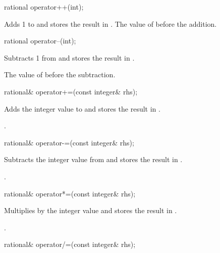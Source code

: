\begin{itemdecl}
rational operator++(int);
\end{itemdecl}

\begin{itemdescr}
\effects Adds 1 to  and stores the result in .
\returns The value of  before the addition.
\end{itemdescr}

\begin{itemdecl}
rational operator--(int);
\end{itemdecl}

\begin{itemdescr}
\effects Subtracts 1 from  and stores the result in .

\returns The value of  before the subtraction.
\end{itemdescr}

\begin{itemdecl}
rational& operator+=(const integer& rhs);
\end{itemdecl}

\begin{itemdescr}
\effects Adds the integer value  to  and stores the result in .

\returns {}.
\end{itemdescr}

\begin{itemdecl}
rational& operator-=(const integer& rhs);
\end{itemdecl}

\begin{itemdescr}
\effects Subtracts the integer value  from  and stores the result in .

\returns {}.
\end{itemdescr}

\begin{itemdecl}
rational& operator*=(const integer& rhs);
\end{itemdecl}

\begin{itemdescr}
\effects Multiplies  by the integer value  and stores the result in .

\returns {}.
\end{itemdescr}

\begin{itemdecl}
rational& operator/=(const integer& rhs);
\end{itemdecl}

